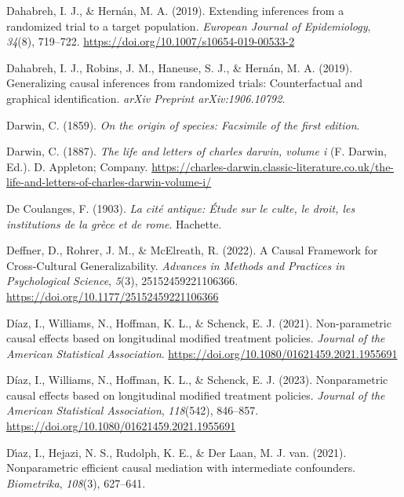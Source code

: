 \documentclass[
  single column]{article}
\newlength{\cslhangindent}
\newenvironment{CSLReferences}[2] %
 {\begin{list}{}{%
  \setlength{\itemindent}{0pt}
  \setlength{\leftmargin}{0pt}
  \setlength{\parsep}{0pt}
  \ifodd #1
   \setlength{\leftmargin}{\cslhangindent}
   \setlength{\itemindent}{-1\cslhangindent}
  \fi
  \setlength{\itemsep}{#2\baselineskip}}}
 {\end{list}}
\begin{document}
\begin{CSLReferences}{1}{0}
Dahabreh, I. J., \& Hernán, M. A. (2019). Extending inferences from a
randomized trial to a target population. \emph{European Journal of
Epidemiology}, \emph{34}(8), 719--722.
\url{https://doi.org/10.1007/s10654-019-00533-2}

Dahabreh, I. J., Robins, J. M., Haneuse, S. J., \& Hernán, M. A. (2019).
Generalizing causal inferences from randomized trials: Counterfactual
and graphical identification. \emph{arXiv Preprint arXiv:1906.10792}.

Darwin, C. (1859). \emph{On the origin of species: Facsimile of the
first edition}.

Darwin, C. (1887). \emph{The life and letters of charles darwin, volume
i} (F. Darwin, Ed.). D. Appleton; Company.
\url{https://charles-darwin.classic-literature.co.uk/the-life-and-letters-of-charles-darwin-volume-i/}

De Coulanges, F. (1903). \emph{La cité antique: Étude sur le culte, le
droit, les institutions de la grèce et de rome}. Hachette.

Deffner, D., Rohrer, J. M., \& McElreath, R. (2022). A Causal Framework
for Cross-Cultural Generalizability. \emph{Advances in Methods and
Practices in Psychological Science}, \emph{5}(3), 25152459221106366.
\url{https://doi.org/10.1177/25152459221106366}

Díaz, I., Williams, N., Hoffman, K. L., \& Schenck, E. J. (2021).
Non-parametric causal effects based on longitudinal modified treatment
policies. \emph{Journal of the American Statistical Association}.
\url{https://doi.org/10.1080/01621459.2021.1955691}

Díaz, I., Williams, N., Hoffman, K. L., \& Schenck, E. J. (2023).
Nonparametric causal effects based on longitudinal modified treatment
policies. \emph{Journal of the American Statistical Association},
\emph{118}(542), 846--857.
\url{https://doi.org/10.1080/01621459.2021.1955691}

Dı́az, I., Hejazi, N. S., Rudolph, K. E., \& Der Laan, M. J. van. (2021).
Nonparametric efficient causal mediation with intermediate confounders.
\emph{Biometrika}, \emph{108}(3), 627--641.


\end{CSLReferences}
\end{document}
